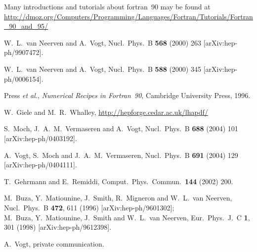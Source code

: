 \documentclass[12pt]{article}
\begin{document}
\begin{thebibliography}{99}
 Many introductions and tutorials about
  fortran~90 may be found at
  \url{http://dmoz.org/Computers/Programming/Languages/Fortran/Tutorials/Fortran_90_and_95/}

  W.~L.~van Neerven and A.~Vogt,
  Nucl.\ Phys.\ B {\bf 568} (2000) 263
  [arXiv:hep-ph/9907472].

  W.~L.~van Neerven and A.~Vogt,
  Nucl.\ Phys.\ B {\bf 588} (2000) 345
  [arXiv:hep-ph/0006154].

  Press {\it et al.}, \emph{Numerical Recipes in Fortran~90},
  Cambridge University Press, 1996.

 W.~Giele and M.~R.~Whalley,
\url{http://hepforge.cedar.ac.uk/lhapdf/}


  S.~Moch, J.~A.~M.~Vermaseren and A.~Vogt,
  Nucl.\ Phys.\ B {\bf 688} (2004) 101
  [arXiv:hep-ph/0403192].

  A.~Vogt, S.~Moch and J.~A.~M.~Vermaseren,
  Nucl.\ Phys.\ B {\bf 691} (2004) 129
  [arXiv:hep-ph/0404111].


  T.~Gehrmann and E.~Remiddi,
  Comput.\ Phys.\ Commun.\  {\bf 144} (2002) 200.


  M.~Buza, Y.~Matiounine, J.~Smith, R.~Migneron and W.~L.~van Neerven,
  Nucl.\ Phys.\ B {\bf 472}, 611 (1996)
  [arXiv:hep-ph/9601302];\\
%
  M.~Buza, Y.~Matiounine, J.~Smith and W.~L.~van Neerven,
  Eur.\ Phys.\ J.\ C {\bf 1}, 301 (1998)
  [arXiv:hep-ph/9612398].
  
 A.~Vogt, private communication.



\end{thebibliography}
\end{document}
